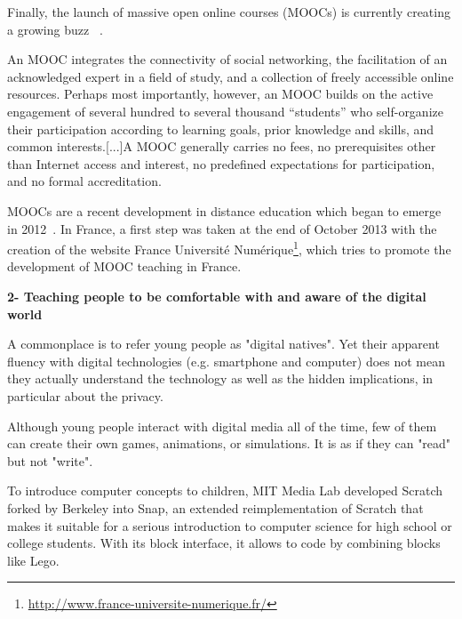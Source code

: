 Finally, the launch of massive open online courses (MOOCs) is currently creating a growing buzz ~\parencite{mackness2010ideals}.

\begin{formal}
    An MOOC integrates the connectivity of social networking, the facilitation of an acknowledged expert in a field of study, and a collection of freely accessible online resources. Perhaps most importantly, however, an MOOC builds on the active engagement of several hundred to several thousand “students” who self-organize their participation according to learning goals, prior knowledge and skills, and common interests.[...]A MOOC generally carries no fees, no prerequisites other than Internet access and interest, no predefined expectations for participation, and no formal accreditation.

\end{formal}

MOOCs are a recent development in distance education which began to emerge in 2012~\parencite{pappano2012year}. In France, a first step was taken at the end of October 2013 with the creation of the website France Université Numérique\footnote{\url{http://www.france-universite-numerique.fr/}}, which tries to promote the development of MOOC teaching in France.


\textbf{2- Teaching people to be comfortable with and aware of the digital world}

A commonplace is to refer young people as "digital natives". Yet their apparent fluency with digital technologies (e.g. smartphone and computer) does not mean they actually understand the technology as well as the hidden implications, in particular about the privacy.

\begin{formal}
    Although young people interact with digital media all of the time, few of them can create their own games, animations, or simulations. It is as if they can "read" but not "write".

\end{formal}

To introduce computer concepts to children, MIT Media Lab developed Scratch~\parencite{resnick2009scratch} forked by Berkeley into Snap, an extended reimplementation of Scratch that makes it suitable for a serious introduction to computer science for high school or college students. With its block interface, it allows to code by combining blocks like Lego.

